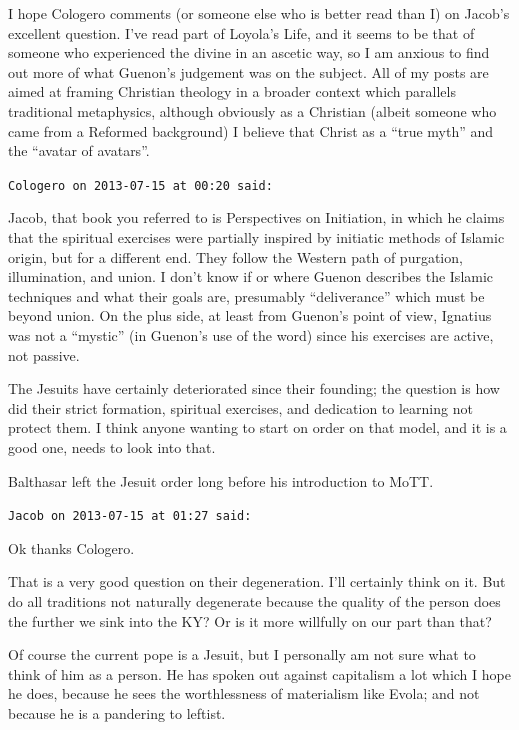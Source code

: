 \begin{footnotesize}
\begin{sffamily}
I hope Cologero comments (or someone else who is better read than I) on Jacob's excellent question. I've read part of Loyola's Life, and it seems to be that of someone who experienced the divine in an ascetic way, so I am anxious to find out more of what Guenon's judgement was on the subject. All of my posts are aimed at framing Christian theology in a broader context which parallels traditional metaphysics, although obviously as a Christian (albeit someone who came from a Reformed background) I believe that Christ as a ``true myth'' and the ``avatar of avatars''.

\hfill

\texttt{Cologero on 2013-07-15 at 00:20 said:}

Jacob, that book you referred to is Perspectives on Initiation, in which he claims that the spiritual exercises were partially inspired by initiatic methods of Islamic origin, but for a different end. They follow the Western path of purgation, illumination, and union. I don't know if or where Guenon describes the Islamic techniques and what their goals are, presumably ``deliverance'' which must be beyond union. On the plus side, at least from Guenon's point of view, Ignatius was not a ``mystic'' (in Guenon's use of the word) since his exercises are active, not passive.

The Jesuits have certainly deteriorated since their founding; the question is how did their strict formation, spiritual exercises, and dedication to learning not protect them. I think anyone wanting to start on order on that model, and it is a good one, needs to look into that.

Balthasar left the Jesuit order long before his introduction to MoTT.

\hfill

\texttt{Jacob on 2013-07-15 at 01:27 said:}

Ok thanks Cologero.

That is a very good question on their degeneration. I'll certainly think on it. But do all traditions not naturally degenerate because the quality of the person does the further we sink into the KY? Or is it more willfully on our part than that?

Of course the current pope is a Jesuit, but I personally am not sure what to think of him as a person. He has spoken out against capitalism a lot which I hope he does, because he sees the worthlessness of materialism like Evola; and not because he is a pandering to leftist.

\hfill


\end{sffamily}
\end{footnotesize}
